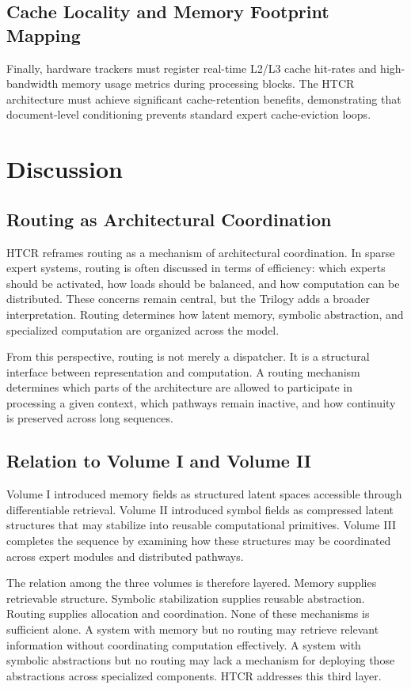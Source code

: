 \section{Cache Locality and Memory Footprint Mapping}
Finally, hardware trackers must register real-time L2/L3 cache hit-rates and high-bandwidth memory usage metrics during processing blocks. The HTCR architecture must achieve significant cache-retention benefits, demonstrating that document-level conditioning prevents standard expert cache-eviction loops.

\chapter{Discussion}

\section{Routing as Architectural Coordination}

HTCR reframes routing as a mechanism of architectural coordination. In sparse expert systems, routing is often discussed in terms of efficiency: which experts should be activated, how loads should be balanced, and how computation can be distributed. These concerns remain central, but the Trilogy adds a broader interpretation. Routing determines how latent memory, symbolic abstraction, and specialized computation are organized across the model.

From this perspective, routing is not merely a dispatcher. It is a structural interface between representation and computation. A routing mechanism determines which parts of the architecture are allowed to participate in processing a given context, which pathways remain inactive, and how continuity is preserved across long sequences.

\section{Relation to Volume I and Volume II}

Volume I introduced memory fields as structured latent spaces accessible through differentiable retrieval. Volume II introduced symbol fields as compressed latent structures that may stabilize into reusable computational primitives. Volume III completes the sequence by examining how these structures may be coordinated across expert modules and distributed pathways.

The relation among the three volumes is therefore layered. Memory supplies retrievable structure. Symbolic stabilization supplies reusable abstraction. Routing supplies allocation and coordination. None of these mechanisms is sufficient alone. A system with memory but no routing may retrieve relevant information without coordinating computation effectively. A system with symbolic abstractions but no routing may lack a mechanism for deploying those abstractions across specialized components. HTCR addresses this third layer.

